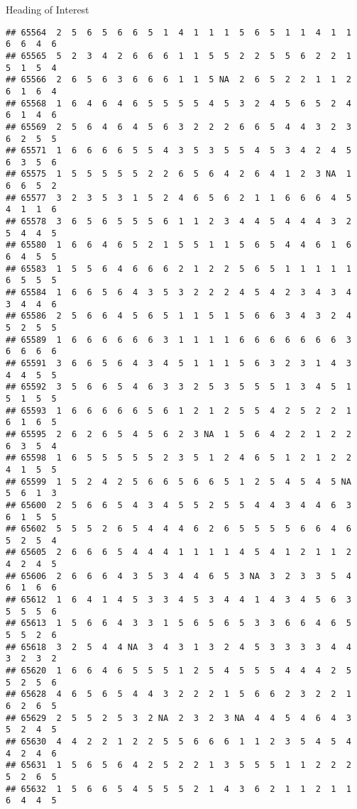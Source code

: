 \documentclass[
  ignorenonframetext,
]{beamer}
\begin{document}
\begin{frame}[fragile]{Heading of Interest}
\begin{verbatim}
## 65564  2  5  6  5  6  6  5  1  4  1  1  1  5  6  5  1  1  4  1  1  6  6  4  6
## 65565  5  2  3  4  2  6  6  6  1  1  5  5  2  2  5  5  6  2  2  1  5  1  5  4
## 65566  2  6  5  6  3  6  6  6  1  1  5 NA  2  6  5  2  2  1  1  2  6  1  6  4
## 65568  1  6  4  6  4  6  5  5  5  5  4  5  3  2  4  5  6  5  2  4  6  1  4  6
## 65569  2  5  6  4  6  4  5  6  3  2  2  2  6  6  5  4  4  3  2  3  6  2  5  5
## 65571  1  6  6  6  6  5  5  4  3  5  3  5  5  4  5  3  4  2  4  5  6  3  5  6
## 65575  1  5  5  5  5  5  2  2  6  5  6  4  2  6  4  1  2  3 NA  1  6  6  5  2
## 65577  3  2  3  5  3  1  5  2  4  6  5  6  2  1  1  6  6  6  4  5  4  1  1  6
## 65578  3  6  5  6  5  5  5  6  1  1  2  3  4  4  5  4  4  4  3  2  5  4  4  5
## 65580  1  6  6  4  6  5  2  1  5  5  1  1  5  6  5  4  4  6  1  6  6  4  5  5
## 65583  1  5  5  6  4  6  6  6  2  1  2  2  5  6  5  1  1  1  1  1  6  5  5  5
## 65584  1  6  6  5  6  4  3  5  3  2  2  2  4  5  4  2  3  4  3  4  3  4  4  6
## 65586  2  5  6  6  4  5  6  5  1  1  5  1  5  6  6  3  4  3  2  4  5  2  5  5
## 65589  1  6  6  6  6  6  6  3  1  1  1  1  6  6  6  6  6  6  6  3  6  6  6  6
## 65591  3  6  6  5  6  4  3  4  5  1  1  1  5  6  3  2  3  1  4  3  4  4  5  5
## 65592  3  5  6  6  5  4  6  3  3  2  5  3  5  5  5  1  3  4  5  1  5  1  5  5
## 65593  1  6  6  6  6  6  5  6  1  2  1  2  5  5  4  2  5  2  2  1  6  1  6  5
## 65595  2  6  2  6  5  4  5  6  2  3 NA  1  5  6  4  2  2  1  2  2  6  3  5  4
## 65598  1  6  5  5  5  5  5  2  3  5  1  2  4  6  5  1  2  1  2  2  4  1  5  5
## 65599  1  5  2  4  2  5  6  6  5  6  6  5  1  2  5  4  5  4  5 NA  5  6  1  3
## 65600  2  5  6  6  5  4  3  4  5  5  2  5  5  4  4  3  4  4  6  3  6  1  5  5
## 65602  5  5  5  2  6  5  4  4  4  6  2  6  5  5  5  5  6  6  4  6  5  2  5  4
## 65605  2  6  6  6  5  4  4  4  1  1  1  1  4  5  4  1  2  1  1  2  4  2  4  5
## 65606  2  6  6  6  4  3  5  3  4  4  6  5  3 NA  3  2  3  3  5  4  6  1  6  6
## 65612  1  6  4  1  4  5  3  3  4  5  3  4  4  1  4  3  4  5  6  3  5  5  5  6
## 65613  1  5  6  6  4  3  3  1  5  6  5  6  5  3  3  6  6  4  6  5  5  5  2  6
## 65618  3  2  5  4  4 NA  3  4  3  1  3  2  4  5  3  3  3  3  4  4  3  2  3  2
## 65620  1  6  6  4  6  5  5  5  1  2  5  4  5  5  5  4  4  4  2  5  5  2  5  6
## 65628  4  6  5  6  5  4  4  3  2  2  2  1  5  6  6  2  3  2  2  1  6  2  6  5
## 65629  2  5  5  2  5  3  2 NA  2  3  2  3 NA  4  4  5  4  6  4  3  5  2  4  5
## 65630  4  4  2  2  1  2  2  5  5  6  6  6  1  1  2  3  5  4  5  4  4  2  4  6
## 65631  1  5  6  5  6  4  2  5  2  2  1  3  5  5  5  1  1  2  2  2  5  2  6  5
## 65632  1  5  6  6  5  4  5  5  5  2  1  4  3  6  2  1  1  2  1  1  6  4  4  5

\end{verbatim}
\end{frame}
\end{document}
